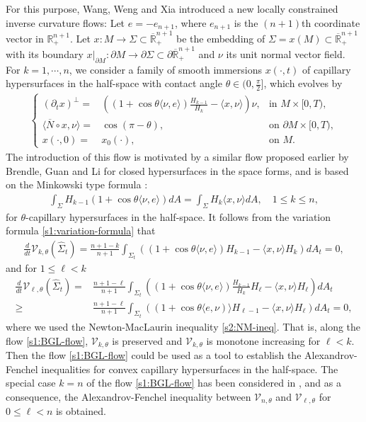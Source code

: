 \documentclass[11pt,reqno]{amsart}
\theoremstyle{definition}
\theoremstyle{remark}
\numberwithin{equation}{section}
\renewcommand{\(}{\left(}
\renewcommand{\)}{\right)}
\renewcommand{\-}{\overline}
\renewcommand{\t}{\theta}
\newcommand{\ra}{\rightarrow}
\begin{document}
For this purpose, Wang, Weng and Xia \cite{Wang-Weng-Xia2022} introduced a new locally constrained inverse curvature flows: Let $e=-e_{n+1}$, where $e_{n+1}$ is the $(n+1)$th coordinate vector in $\mathbb R_+^{n+1}$. Let $x:M\ra \Sigma \subset \-{\mathbb R}^{n+1}_{+}$ be the embedding of $\Sigma=x(M)\subset \-{\mathbb R}^{n+1}_{+}$ with its boundary $x|_{\partial M}:\partial M \ra \partial \Sigma \subset \partial\overline{\mathbb R}^{n+1}_+$ and $\nu$ its unit normal vector field.  For $k=1,\cdots,n$, we consider a family of smooth immersions $x(\cdot,t)$ of capillary hypersurfaces in the half-space with contact angle $\t\in (0,\frac{\pi}{2}]$, which evolves by
\begin{align}\label{s1:BGL-flow}
\left\{\begin{aligned}(\partial_t x)^\bot=&\((1+\cos\t\langle \nu,e\rangle)\frac{H_{k-1}}{H_k}-\langle x,\nu\rangle\)\nu, &\text{in $M\times [0,T)$},\\
\langle \-N\circ x,\nu\rangle=&\cos(\pi-\t), &\text{on $\partial M\times [0,T)$},\\
x(\cdot,0)=&x_0(\cdot), &\text{on $M$}.
\end{aligned}\right.
\end{align}
The introduction of this flow is motivated by a similar flow proposed earlier by Brendle, Guan and Li \cite{BGL} for closed hypersurfaces in the space forms, and is based on the Minkowski type formula \cite[Proposition 2.5]{Wang-Weng-Xia2022}:
\begin{align}\label{s1:Minkowski-formula}
\int_{\Sigma}H_{k-1}(1+\cos\t\langle \nu,e\rangle) dA=\int_{\Sigma} H_k\langle x,\nu\rangle dA, \quad 1\leq k\leq n,
\end{align}
 for $\t$-capillary hypersurfaces in the half-space. It follows from the variation formula \eqref{s1:variation-formula} that
\begin{align}\label{s1:evol-V-ell}
\frac{d}{dt}\mathcal{V}_{k,\t}(\widehat{\Sigma}_t)=\frac{n+1-k}{n+1}\int_{\Sigma_t}\((1+\cos\t\langle \nu,e\rangle) H_{k-1}-\langle x,\nu\rangle H_{k}\)dA_t=0,
\end{align}
and for $1\leq \ell<k$
\begin{align}\label{s1:evol-V-k}
\frac{d}{dt}\mathcal{V}_{\ell,\t}(\widehat{\Sigma}_t)=&\frac{n+1-\ell}{n+1}\int_{\Sigma_t}\((1+\cos\t\langle \nu,e\rangle)\frac{H_{k-1}}{H_{k}}H_\ell-\langle x,\nu\rangle H_{\ell}\)dA_t \nonumber\\
  \geq &\frac{n+1-\ell}{n+1}\int_{\Sigma_t}\((1+\cos\t\langle e,\nu)\rangle H_{\ell-1}-\langle x,\nu\rangle H_{\ell}\)dA_t=0,
\end{align}
where we used the Newton-MacLaurin inequality \eqref{s2:NM-ineq}. That is, along the flow \eqref{s1:BGL-flow}, $\mathcal{V}_{k,\t}$ is preserved and $\mathcal{V}_{k,\t}$ is monotone increasing for $\ell<k$. Then the flow \eqref{s1:BGL-flow} could be used as a tool to establish the Alexandrov-Fenchel inequalities for convex capillary hypersurfaces in the half-space. The special case $k=n$ of the flow \eqref{s1:BGL-flow} has been considered in \cite{Wang-Weng-Xia2022}, and as a consequence, the Alexandrov-Fenchel inequality between $\mathcal{V}_{n,\t}$ and $\mathcal{V}_{\ell,\t}$ for $0\leq \ell<n$ is obtained.
\end{document}

